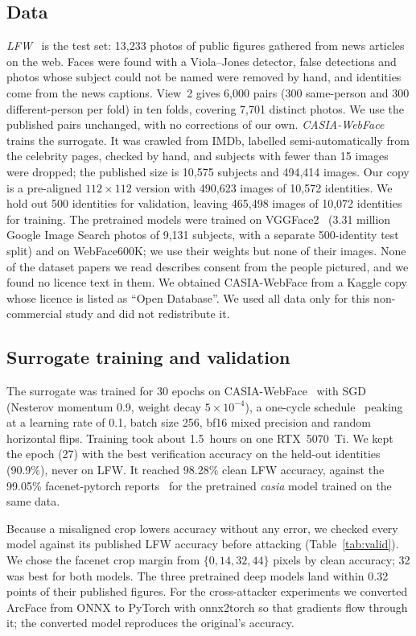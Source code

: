 \documentclass[conference]{IEEEtran}
\begin{document}
\subsection{Data}
\emph{LFW}~\cite{lfw} is the test set: 13,233 photos of public figures gathered from news articles on the web. Faces
were found with a Viola--Jones detector, false detections and photos whose subject could not be named were removed by
hand, and identities come from the news captions. View~2 gives 6,000 pairs (300 same-person and 300 different-person
per fold) in ten folds, covering 7,701 distinct photos. We use the published pairs unchanged, with no corrections of
our own. \emph{CASIA-WebFace}~\cite{casia} trains the surrogate. It was crawled from IMDb, labelled
semi-automatically from the celebrity pages, checked by hand, and subjects with fewer than 15 images were dropped;
the published size is 10,575 subjects and 494,414 images. Our copy is a pre-aligned $112\times112$ version with
490,623 images of 10,572 identities. We hold out 500 identities for validation, leaving 465,498 images of 10,072
identities for training. The pretrained models were trained on VGGFace2~\cite{vggface2} (3.31 million Google Image
Search photos of 9,131 subjects, with a separate 500-identity test split) and on WebFace600K; we use their weights
but none of their images. None of the dataset papers we read describes consent from the people pictured, and we
found no licence text in them. We obtained CASIA-WebFace from a Kaggle copy whose licence is listed as ``Open
Database''. We used all data only for this non-commercial study and did not redistribute it.

\subsection{Surrogate training and validation}
The surrogate was trained for 30 epochs on CASIA-WebFace~\cite{casia} with SGD (Nesterov momentum 0.9, weight decay $5\times10^{-4}$), a one-cycle
schedule~\cite{onecycle} peaking at a
learning rate of 0.1, batch size 256, bf16 mixed precision and random horizontal flips. Training took about
1.5~hours on one RTX~5070~Ti. We kept the epoch (27) with the best verification accuracy on the held-out
identities (90.9\%), never on LFW. It reached 98.28\% clean LFW accuracy, against the 99.05\% facenet-pytorch reports~\cite{facenetpytorch} for the pretrained \emph{casia} model
trained on the same data.

Because a misaligned crop lowers accuracy without any error, we checked every model against its published LFW
accuracy before attacking (Table~\ref{tab:valid}). We chose the facenet crop margin from $\{0, 14, 32, 44\}$
pixels by clean accuracy; 32 was best for both models. The three pretrained deep models land within 0.32
points of their published figures. For the cross-attacker experiments we converted ArcFace from ONNX to PyTorch
with onnx2torch so that gradients flow through it; the converted model reproduces the original's accuracy.
\end{document}
